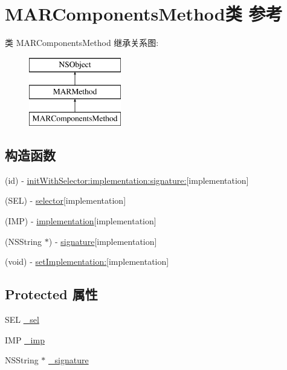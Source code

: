 \hypertarget{interface_m_a_r_components_method}{}\section{M\+A\+R\+Components\+Method类 参考}
\label{interface_m_a_r_components_method}
类 M\+A\+R\+Components\+Method 继承关系图\+:\begin{figure}[H]
\begin{center}
\leavevmode
\includegraphics[height=3.000000cm]{interface_m_a_r_components_method}
\end{center}
\end{figure}
\subsection*{构造函数}
\begin{DoxyCompactItemize}
\item 
(id) -\/ \hyperlink{interface_m_a_r_components_method_a0e5813245bb33306a4c7abcd7c50b47a}{init\+With\+Selector\+:implementation\+:signature\+:}{\ttfamily  \mbox{[}implementation\mbox{]}}
\item 
(S\+EL) -\/ \hyperlink{interface_m_a_r_components_method_a900cfb4b1ce47fdc3842b9e4fa9cf7ef}{selector}{\ttfamily  \mbox{[}implementation\mbox{]}}
\item 
(I\+MP) -\/ \hyperlink{interface_m_a_r_components_method_af64dff38676e16327468cf8fdfb8b40f}{implementation}{\ttfamily  \mbox{[}implementation\mbox{]}}
\item 
(N\+S\+String $\ast$) -\/ \hyperlink{interface_m_a_r_components_method_ae5775c8f2ea6bcec3aede94d80986c91}{signature}{\ttfamily  \mbox{[}implementation\mbox{]}}
\item 
(void) -\/ \hyperlink{interface_m_a_r_components_method_a597ccc0d0565e2c53a3e6f782ae2729d}{set\+Implementation\+:}{\ttfamily  \mbox{[}implementation\mbox{]}}
\end{DoxyCompactItemize}
\subsection*{Protected 属性}
\begin{DoxyCompactItemize}
\item 
S\+EL \hyperlink{interface_m_a_r_components_method_a7a1a442c988ec1af5f5091bc476fbe94}{\+\_\+sel}
\item 
I\+MP \hyperlink{interface_m_a_r_components_method_a9443c4b3d1c3c898c13c0b3ca79e35e3}{\+\_\+imp}
\item 
N\+S\+String $\ast$ \hyperlink{interface_m_a_r_components_method_aa48507eca6c12fed45aeb738dd37956c}{\+\_\+signature}
\end{DoxyCompactItemize}
